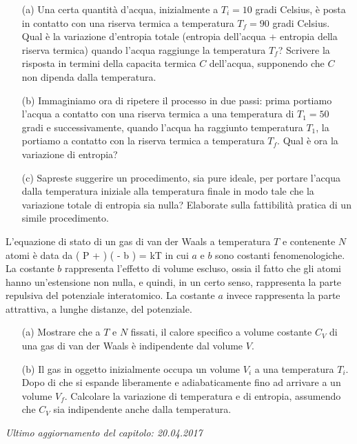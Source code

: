 
\begin{Exercise}[title={Cara, butta giù la pasta che sto arrivando!}, label={ex1:pasta}]
\begin{itemize}
\item[(a)]
Una certa quantità d'acqua, inizialmente a $T_i = 10$ gradi Celsius, è posta in contatto con una riserva termica a temperatura $T_f = 90$ gradi Celsius. Qual è la variazione d'entropia totale (entropia dell'acqua + entropia della riserva termica) quando l'acqua raggiunge la temperatura $T_f$? Scrivere la risposta in termini della capacita termica $C$ dell'acqua, supponendo che $C$ non dipenda dalla temperatura.
\item[(b)]
Immaginiamo ora di ripetere il processo in due passi: prima portiamo l'acqua a contatto con una riserva termica a una temperatura di $T_1 = 50$ gradi e successivamente, quando l'acqua ha raggiunto temperatura $T_1$, la portiamo a contatto con la riserva termica a temperatura $T_f$. Qual è ora la variazione di entropia?
\item[(c)]
Sapreste suggerire un procedimento, sia pure ideale, per portare l'acqua dalla temperatura iniziale alla temperatura finale in modo tale che la variazione totale di entropia sia nulla? Elaborate sulla fattibilità pratica di un simile procedimento.
\end{itemize}
\end{Exercise}


\begin{Exercise}[title={Gas di van der Waals}, label={ex1:vanderWaals}]
L'equazione di stato di un gas di van der Waals a temperatura $T$ e contenente $N$ atomi è data da
\be
\left(
P + 
\right)
\left(
 - b
\right) = kT
\ee
in cui $a$ e $b$ sono costanti fenomenologiche. La costante $b$ rappresenta l'effetto di volume escluso, ossia il fatto che gli atomi hanno un'estensione non nulla, e quindi, in un certo senso, rappresenta la parte repulsiva del potenziale interatomico. La costante $a$ invece rappresenta la parte attrattiva, a lunghe distanze, del potenziale.

\begin{itemize}
\item[(a)] Mostrare che a $T$ e $N$ fissati, il calore specifico a volume costante $C_V$ di una gas di van der Waals è indipendente dal volume $V$.
\item[(b)] Il gas in oggetto inizialmente occupa un volume $V_i$ a una temperatura $T_i$. Dopo di che si espande liberamente e adiabaticamente fino ad arrivare a un volume $V_f$. Calcolare la variazione di temperatura e di entropia, assumendo che $C_V$ sia indipendente anche dalla temperatura.
\end{itemize}
\end{Exercise}

\vskip 0.75cm
\begin{flushright}
{\em Ultimo aggiornamento del capitolo: 20.04.2017}
\end{flushright}
